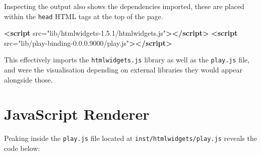 \documentclass[
]{krantz}
\makeatletter
\newenvironment{Shaded}{\begin{snugshade}}{\end{snugshade}}
\newcommand{\KeywordTok}[1]{\textcolor[rgb]{0.27,0.27,0.27}{\textbf{#1}}}
\newcommand{\OtherTok}[1]{\textcolor[rgb]{0.37,0.37,0.37}{#1}}
\newcommand{\StringTok}[1]{\textcolor[rgb]{0.5,0.5,0.5}{#1}}
\newenvironment{kframe}{%
\medskip{}
\setlength{\fboxsep}{.8em}
 \def\at@end@of@kframe{}%
 \ifinner\ifhmode%
  \def\at@end@of@kframe{\end{minipage}}%
  \begin{minipage}{\columnwidth}%
 \fi\fi%
 \def\FrameCommand##1{\hskip\@totalleftmargin \hskip-\fboxsep
 \colorbox{shadecolor}{##1}\hskip-\fboxsep
     \hskip-\linewidth \hskip-\@totalleftmargin \hskip\columnwidth}%
 \MakeFramed {\advance\hsize-\width
   \@totalleftmargin\z@ \linewidth\hsize
   \@setminipage}}%
 {\par\unskip\endMakeFramed%
 \at@end@of@kframe}
\renewenvironment{Shaded}{\begin{kframe}}{\end{kframe}}
\makeatother
\begin{document}
Inspecting the output also shows the dependencies imported, these are placed within the \texttt{head} HTML tags at the top of the page.

\begin{Shaded}
\begin{Highlighting}[]
\KeywordTok{<script}\OtherTok{ src=}\StringTok{"lib/htmlwidgets{-}1.5.1/htmlwidgets.js"}\KeywordTok{></script>}
\KeywordTok{<script}\OtherTok{ src=}\StringTok{"lib/play{-}binding{-}0.0.0.9000/play.js"}\KeywordTok{></script>}
\end{Highlighting}
\end{Shaded}

This effectively imports the \texttt{htmlwidgets.js} library as well as the \texttt{play.js} file, and were the visualisation depending on external libraries they would appear alongside those.

\hypertarget{javascript-renderer}{%
\section*{JavaScript Renderer}\label{javascript-renderer}}


Peaking inside the \texttt{play.js} file located at \texttt{inst/htmlwidgets/play.js} reveals the code below:
\end{document}
